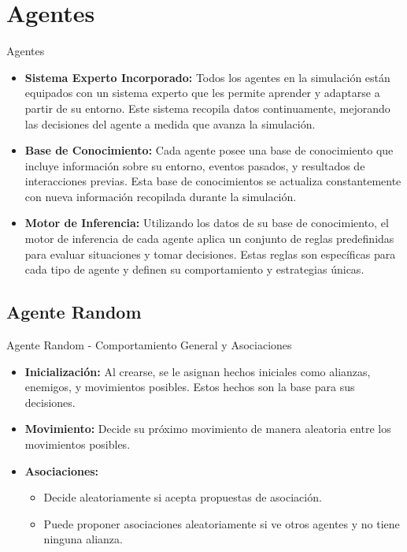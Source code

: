 \documentclass{beamer}
\begin{document}
\section{Agentes}
\begin{frame}{Agentes}
  \begin{itemize}
    \item \textbf{Sistema Experto Incorporado:} Todos los agentes en la simulación están equipados con un sistema experto que les permite aprender y adaptarse a partir de su entorno. Este sistema recopila datos continuamente, mejorando las decisiones del agente a medida que avanza la simulación.
    \item \textbf{Base de Conocimiento:} Cada agente posee una base de conocimiento que incluye información sobre su entorno, eventos pasados, y resultados de interacciones previas. Esta base de conocimientos se actualiza constantemente con nueva información recopilada durante la simulación.
    \item \textbf{Motor de Inferencia:} Utilizando los datos de su base de conocimiento, el motor de inferencia de cada agente aplica un conjunto de reglas predefinidas para evaluar situaciones y tomar decisiones. Estas reglas son específicas para cada tipo de agente y definen su comportamiento y estrategias únicas.
  \end{itemize}
\end{frame}

\subsection{Agente Random}
\begin{frame}{Agente Random - Comportamiento General y Asociaciones}
  \begin{itemize}
    \item \textbf{Inicialización:} Al crearse, se le asignan hechos iniciales como alianzas, enemigos, y movimientos posibles. Estos hechos son la base para sus decisiones.
    \item \textbf{Movimiento:} Decide su próximo movimiento de manera aleatoria entre los movimientos posibles.
    \item \textbf{Asociaciones:}
          \begin{itemize}
            \item Decide aleatoriamente si acepta propuestas de asociación.
            \item Puede proponer asociaciones aleatoriamente si ve otros agentes y no tiene ninguna alianza.
          \end{itemize}
  \end{itemize}
\end{frame}
\end{document}
